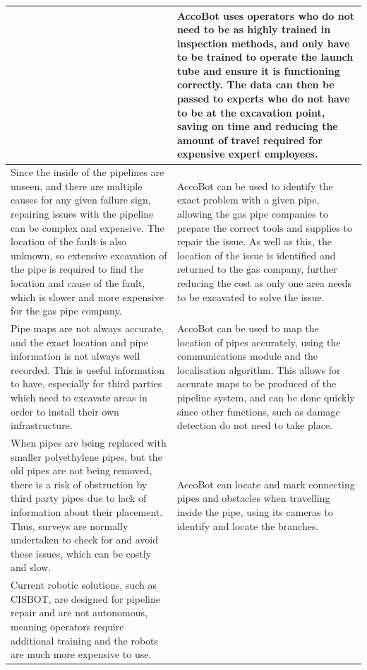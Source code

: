\documentclass[11pt]{article}		%
\begin{document}
\begin{longtable}[c]{| m{} | m{} |}
			& 
			AccoBot uses operators who do not need to be as highly trained in inspection methods, and only have to be trained to operate the launch tube and ensure it is functioning correctly.
			The data can then be passed to experts who do not have to be at the excavation point, saving on time and reducing the amount of travel required for expensive expert employees.
			\\
			\hline
			\rowcolor{rowGrey}
			Since the inside of the pipelines are unseen, and there are multiple causes for any given failure sign, repairing issues with the pipeline can be complex and expensive.
			The location of the fault is also unknown, so extensive excavation of the pipe is required to find the location and cause of the fault, which is slower and more expensive for the gas pipe company.
			& 
			AccoBot can be used to identify the exact problem with a given pipe, allowing the gas pipe companies to prepare the correct tools and supplies to repair the issue.
			As well as this, the location of the issue is identified and returned to the gas company, further reducing the cost as only one area needs to be excavated to solve the issue.
			\\
			\hline
			\rowcolor{rowGrey}
			Pipe maps are not always accurate, and the exact location and pipe information is not always well recorded.
			This is useful information to have, especially for third parties which need to excavate areas in order to install their own infrastructure.
			& 
			AccoBot can be used to map the location of pipes accurately, using the communications module and the localisation algorithm.
			This allows for accurate maps to be produced of the pipeline system, and can be done quickly since other functions, such as damage detection do not need to take place.
			\\
			\hline
			\rowcolor{rowGrey}
			When pipes are being replaced with smaller polyethylene pipes, but the old pipes are not being removed, there is a risk of obstruction by third party pipes due to lack of information about their placement.
			Thus, surveys are normally undertaken to check for and avoid these issues, which can be costly and slow.
			& 
			AccoBot can locate and mark connecting pipes and obstacles when travelling inside the pipe, using its cameras to identify and locate the branches.
			\\
			\hline
			\rowcolor{rowGrey} Current robotic solutions, such as CISBOT, are designed for pipeline repair and are not autonomous, meaning operators require additional training and the robots are much more expensive to use.

\end{longtable}
\end{document}
